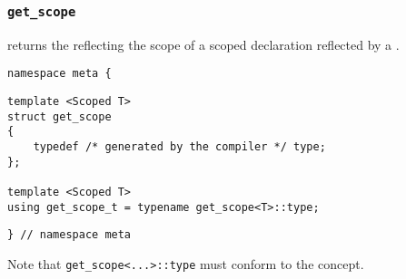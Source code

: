 

\subsubsection{\texttt{get\_scope}}

returns the  reflecting the scope of a scoped declaration reflected by a .

\begin{verbatim}
namespace meta {
\end{verbatim}
\begin{verbatim}
template <Scoped T>
struct get_scope
{
	typedef /* generated by the compiler */ type;
};
	
template <Scoped T>
using get_scope_t = typename get_scope<T>::type;

\end{verbatim}
\begin{verbatim}
} // namespace meta
\end{verbatim}


Note that \texttt{get\_scope<...>::type}
must conform to the  concept.
